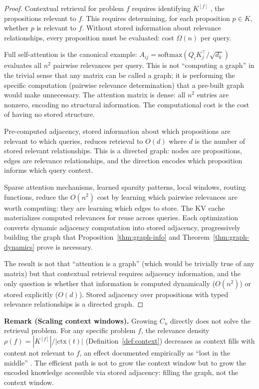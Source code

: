 \documentclass[11pt]{article}
\theoremstyle{definition}
\begin{document}
\begin{proof}
Contextual retrieval for problem $f$ requires identifying $K^{[f]}$
, the propositions relevant to $f$. This requires determining, for
each proposition $p \in K$, whether $p$ is relevant to $f$. Without
stored information about relevance relationships, every proposition must
be evaluated: cost $\Omega(n)$ per query.

Full self-attention is the canonical example:
$A_{ij} = \mathrm{softmax}(Q_i K_j^\top / \sqrt{d_k})$ evaluates all
$n^2$ pairwise relevances per query. This is not ``computing a graph''
in the trivial sense that any matrix can be called a graph; it is
performing the specific computation (pairwise relevance determination)
that a pre-built graph would make unnecessary. The attention matrix is
dense: all $n^2$ entries are nonzero, encoding no structural
information. The computational cost is the cost of having no stored
structure.

Pre-computed adjacency, stored information about which propositions
are relevant to which queries, reduces retrieval to $O(d)$ where $d$
is the number of stored relevant relationships. This is a directed
graph: nodes are propositions, edges are relevance relationships, and
the direction encodes which proposition informs which query context.

Sparse attention mechanisms, learned sparsity patterns, local
windows, routing functions, reduce the $O(n^2)$ cost by learning
which pairwise relevances are worth computing: they are learning which
edges to store. The KV cache materializes computed relevances for reuse
across queries. Each optimization converts dynamic adjacency computation
into stored adjacency, progressively building the graph that
Proposition~\ref{thm:graph-info} and Theorem~\ref{thm:graph-dynamics} prove is
necessary.

The result is not that ``attention is a graph'' (which would be
trivially true of any matrix) but that contextual retrieval requires
adjacency information, and the only question is whether that information
is computed dynamically ($O(n^2)$) or stored explicitly ($O(d)$). Stored
adjacency over propositions with typed relevance relationships is a
directed graph.
\end{proof}

\textbf{Remark (Scaling context windows).}
Growing $C_n$ directly does not solve the retrieval problem. For any
specific problem $f$, the relevance density $\rho(f) = |K^{[f]}| /
|\mathrm{ctx}(t)|$ (Definition~\ref{def:context}) decreases as context
fills with content not relevant to $f$, an effect documented
empirically as ``lost in the middle'' \cite{Liu2024}. The efficient
path is not to grow the context window but to grow the encoded knowledge
accessible via stored adjacency: filling the graph, not the context
window.
\end{document}
